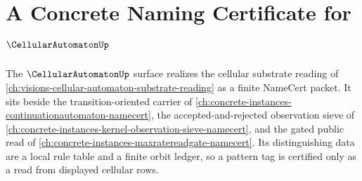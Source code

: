 \chapter{A Concrete Naming Certificate for $\CellularAutomatonUp$}
\label{ch:concrete-instances-cellularautomaton-namecert}

The $\CellularAutomatonUp$ surface realizes the cellular substrate reading of \autoref{ch:visions-cellular-automaton-substrate-reading} as a finite NameCert packet. It sits beside the transition-oriented carrier of \autoref{ch:concrete-instances-continuationautomaton-namecert}, the accepted-and-rejected observation sieve of \autoref{ch:concrete-instances-kernel-observation-sieve-namecert}, and the gated public read of \autoref{ch:concrete-instances-maxratereadgate-namecert}. Its distinguishing data are a local rule table and a finite orbit ledger, so a pattern tag is certified only as a read from displayed cellular rows.



